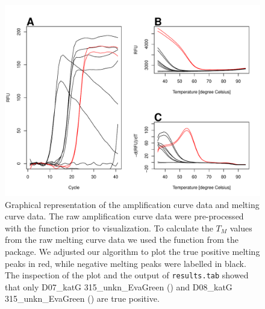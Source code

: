 \begin{figure}[htbp]
  \centering
  \includegraphics[clip=true, width=12cm]{figures/amp_melt.pdf} 
\caption{Graphical representation of the amplification curve data and melting 
curve data.  The raw amplification curve data were pre-processed 
with the  function prior to visualization. To calculate the $T_{M}$ 
values from the raw melting curve data  we used the  
function from the  package.  We adjusted our 
algorithm to plot the true positive melting peaks in red, while negative melting 
peaks were labelled in black. The inspection of the plot and the output of 
\texttt{results.tab} showed that only D07\_katG 315\_unkn\_EvaGreen 
(\textcolor{red}\textemdash) and D08\_katG 315\_unkn\_EvaGreen 
(\textcolor{red}\textemdash) are true positive.
} 
\label{figure:amp_melt}
\end{figure}

